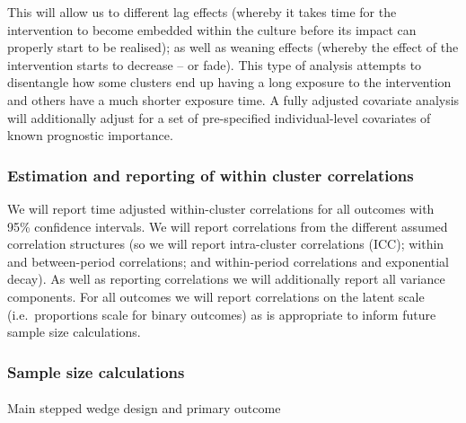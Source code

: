 \documentclass[
]{scrartcl}
\makeatletter
\let\oldparagraph\paragraph
\renewcommand{\paragraph}{
    \@ifstar
      \xxxParagraphStar
      \xxxParagraphNoStar
  }
\newcommand{\xxxParagraphStar}[1]{\oldparagraph*{#1}\mbox{}}
\newcommand{\xxxParagraphNoStar}[1]{\oldparagraph{#1}\mbox{}}
\makeatother
\begin{document}
This will allow us to different lag effects (whereby it takes time for
the intervention to become embedded within the culture before its impact
can properly start to be realised); as well as weaning effects (whereby
the effect of the intervention starts to decrease -- or fade). This type
of analysis attempts to disentangle how some clusters end up having a
long exposure to the intervention and others have a much shorter
exposure time. A fully adjusted covariate analysis will additionally
adjust for a set of pre-specified individual-level covariates of known
prognostic importance.

\subsubsection{Estimation and reporting of within cluster
correlations}\label{estimation-and-reporting-of-within-cluster-correlations}

We will report time adjusted within-cluster correlations for all
outcomes with 95\% confidence intervals. We will report correlations
from the different assumed correlation structures (so we will report
intra-cluster correlations (ICC); within and between-period
correlations; and within-period correlations and exponential decay). As
well as reporting correlations we will additionally report all variance
components. For all outcomes we will report correlations on the latent
scale (i.e.~proportions scale for binary outcomes) as is appropriate to
inform future sample size calculations.

\subsubsection{Sample size calculations}\label{sample-size-calculations}

\paragraph{Main stepped wedge design and primary
outcome}\label{main-stepped-wedge-design-and-primary-outcome}
\end{document}

